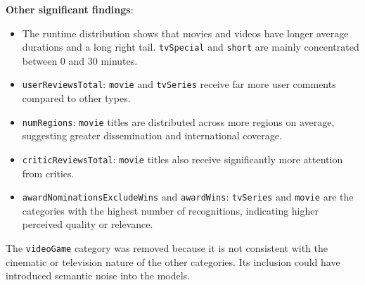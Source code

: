 \documentclass[10pt]{article}
\begin{document}
\textbf{Other significant findings}:
\begin{itemize}
    \item The runtime distribution shows that movies and videos have longer average durations and a long right tail. \texttt{tvSpecial} and \texttt{short} are mainly concentrated between 0 and 30 minutes.
    \item \texttt{userReviewsTotal}: \texttt{movie} and \texttt{tvSeries} receive far more user comments compared to other types.
    \item \texttt{numRegions}: \texttt{movie} titles are distributed across more regions on average, suggesting greater dissemination and international coverage.
    \item \texttt{criticReviewsTotal}: \texttt{movie} titles also receive significantly more attention from critics.
    \item \texttt{awardNominationsExcludeWins} and \texttt{awardWins}: \texttt{tvSeries} and \texttt{movie} are the categories with the highest number of recognitions, indicating higher perceived quality or relevance.
\end{itemize}
The \texttt{videoGame} category was removed because it is not consistent with the cinematic or television nature of the other categories. Its inclusion could have introduced semantic noise into the models.\\
\end{document}
